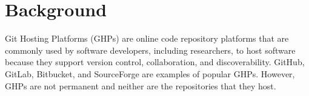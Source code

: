 \chapter{Background}
\label{ch:background}




Git Hosting Platforms (GHPs) are online code repository platforms that are commonly used by software developers, including researchers, to host software because they support version control, collaboration, and discoverability. GitHub, GitLab, Bitbucket, and SourceForge are examples of popular GHPs. However, GHPs are not permanent and neither are the repositories that they host. 
